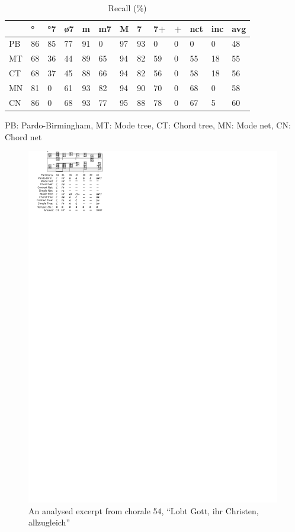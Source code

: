 \documentclass{article}
\begin{document}
\begin{table}
  \centering
  \begin{tabular}{l|p{.1cm}p{.1cm}p{.1cm}p{.1cm}p{.1cm}p{.1cm}p{.1cm}p{.1cm}p{.01cm}p{.1cm}p{.35cm}|p{.3cm}}
                 &  °& °7& ø7& m&  m7&  M&  7& 7+&+&nct& inc& avg\\
    \hline
    PB   & 86& 85& 77& 91&  0& 97& 93&  0&  0&  0&  0& 48 \\
    MT   & 68& 36& 44& 89& 65& 94& 82& 59&  0& 55& 18& 55 \\
    CT   & 68& 37& 45& 88& 66& 94& 82& 56&  0& 58& 18& 56 \\
    MN   & 81&  0& 61& 93& 82& 94& 90& 70&  0& 68&  0& 58 \\
    CN   & 86&  0& 68& 93& 77& 95& 88& 78&  0& 67&  5& 60 \\
  \end{tabular}

\medskip

PB: Pardo-Birmingham, MT: Mode tree, CT: Chord tree, MN: Mode net,
CN: Chord net

  \caption{Recall (\%)}
  \label{tab:recall}
\end{table}

\begin{figure}
  \centering
  \includegraphics[scale=4]{coral-054}
  \caption{An analysed excerpt from chorale 54, ``Lobt Gott, ihr
    Christen, allzugleich''}
  \label{fig:coral-54}
\end{figure}
\end{document}
